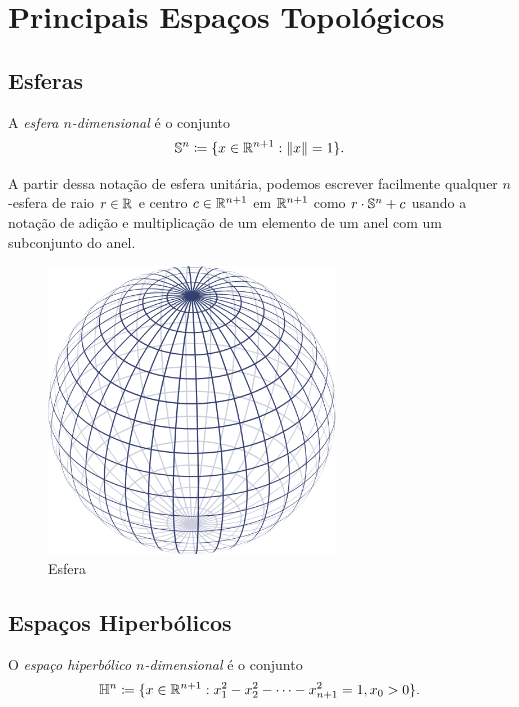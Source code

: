 \chapter{Principais Espaços Topológicos}

\section{Esferas}

\begin{defi}
	A \emph{esfera $n$-dimensional} é o conjunto
	\begin{equation*}
	\Es^n \coloneqq \{x \in \R^{n+1}: \nor{x}=1\}.
	\end{equation*}
\end{defi}

A partir dessa notação de esfera unitária, podemos escrever facilmente qualquer $n$-esfera de raio $r \in \mathbb{R}$ e centro $c \in \mathbb{R}^{n+1}$ em $\mathbb{R}^{n+1}$ como $r \cdot \mathbb{S}^n + c$ usando a notação de adição e multiplicação de um elemento de um anel com um subconjunto do anel.

\begin{figure}[!h]
\centering
\includegraphics[width=3in]{./imagens/esfera}
\caption{Esfera}
\end{figure}


\section{Espaços Hiperbólicos}

\begin{defi}
	O \emph{espaço hiperbólico $n$-dimensional} é o conjunto
	\begin{equation*}
	\Hip^n \coloneqq \{x \in \R^{n+1}: x_1^2-x_2^2-\cdots -x_{n+1}^2=1,\\ x_0>0 \}.
	\end{equation*}
\end{defi}

